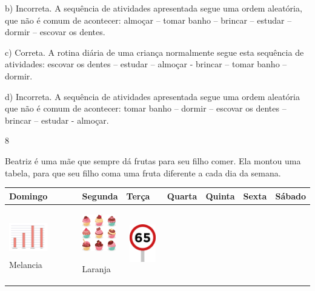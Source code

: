 \begin{escolha}
\begin{escolha}
{{{{{{{{b) Incorreta. A sequência de atividades apresentada segue uma ordem
aleatória, que não é comum de acontecer: almoçar -- tomar banho -- brincar
-- estudar -- dormir -- escovar os dentes.

c) Correta. A rotina diária de uma criança normalmente segue esta sequência
de atividades: escovar os dentes -- estudar -- almoçar - brincar -- tomar banho -- dormir.

d) Incorreta. A sequência de atividades apresentada segue uma ordem
aleatória que não é comum de acontecer: tomar banho -- dormir -- escovar
os dentes -- brincar -- estudar - almoçar.

\num{8}

Beatriz é uma mãe que sempre dá frutas para seu filho comer. Ela
montou uma tabela, para que seu filho coma uma fruta diferente a cada
dia da semana.

\begin{longtable}[]{@{}lllllll@{}}
\toprule
Domingo & Segunda & Terça & Quarta & Quinta & Sexta &
Sábado\tabularnewline
\midrule
\endhead
\begin{minipage}[t]{0.14\columnwidth}\raggedright\strut
\includegraphics[width=0.65929in,height=0.64094in]{media/image149.png}Melancia\strut
\end{minipage} & \begin{minipage}[t]{0.14\columnwidth}\raggedright\strut
\includegraphics[width=0.57512in,height=0.64094in]{media/image150.png}

Laranja\strut
\end{minipage} & \begin{minipage}[t]{0.14\columnwidth}\raggedright\strut
\includegraphics[width=0.59540in,height=0.64607in]{media/image151.png}


\end{minipage}
\end{longtable}}}}}}}}}
\end{escolha}
\end{escolha}

